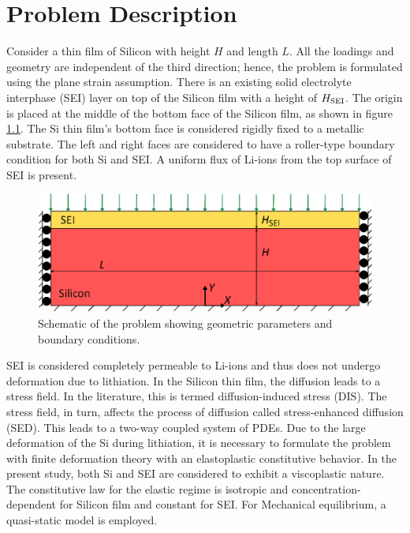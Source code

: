 \chapter{Problem Description}
Consider a thin film of Silicon with height $H$ and length $L$. All the loadings and geometry are independent of the third direction; hence, the problem is formulated using the plane strain assumption. There is an existing solid electrolyte interphase (SEI) layer on top of the Silicon film with a height of $H_{\rm{SEI}}$. The origin is placed at the middle of the bottom face of the Silicon film, as shown in figure \ref{fig:probDesc}. The Si thin film's bottom face is considered rigidly fixed to a metallic substrate. The left and right faces are considered to have a roller-type boundary condition for both Si and SEI. A uniform flux of Li-ions from the top surface of SEI is present. 
\begin{figure}[H]
    \centering
    \includegraphics[width=\textwidth]{figures/probDescFigs/drawing.eps}
    \caption{Schematic of the problem showing geometric parameters and boundary conditions.}
    \label{fig:probDesc}
\end{figure}
SEI is considered completely permeable to Li-ions and thus does not undergo deformation due to lithiation. In the Silicon thin film, the diffusion leads to a stress field. In the literature, this is termed diffusion-induced stress (DIS). The stress field, in turn, affects the process of diffusion called stress-enhanced diffusion (SED). This leads to a two-way coupled system of PDEs.
Due to the large deformation of the Si during lithiation, it is necessary to formulate the problem with finite deformation theory with an elastoplastic constitutive behavior. In the present study, both Si and SEI are considered to exhibit a viscoplastic nature. The constitutive law for the elastic regime is isotropic and concentration-dependent for Silicon film and constant for SEI. 
For Mechanical equilibrium, a quasi-static model is employed.